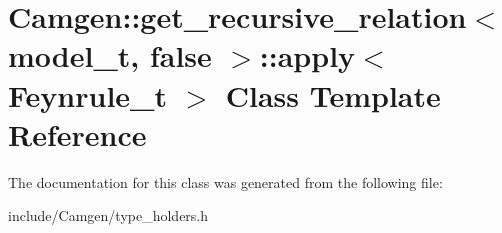 \hypertarget{a00012}{}\section{Camgen\+:\+:get\+\_\+recursive\+\_\+relation$<$ model\+\_\+t, false $>$\+:\+:apply$<$ Feynrule\+\_\+t $>$ Class Template Reference}
\label{a00012}


The documentation for this class was generated from the following file\+:\begin{DoxyCompactItemize}
\item 
include/\+Camgen/type\+\_\+holders.\+h\end{DoxyCompactItemize}
